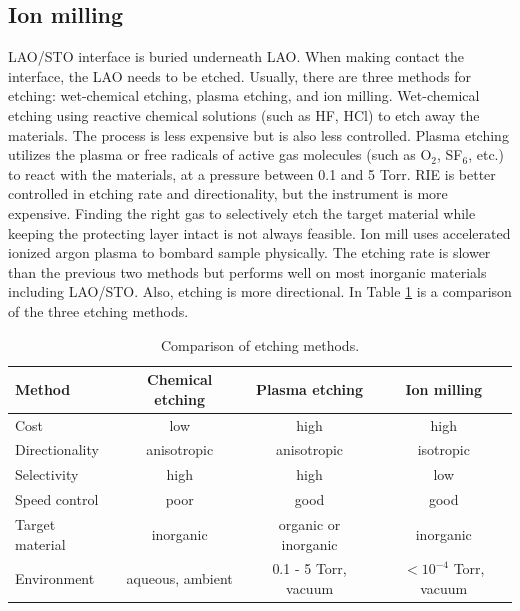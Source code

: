 \documentclass[pdflatex, sectionletters, 12pt]{pittetd}    %
\begin{document}
\subsection{Ion milling}
\label{SEC:IonMilling}
LAO/STO interface is buried underneath LAO. When making contact the interface, the LAO needs to be etched. Usually, there are three methods for etching: wet-chemical etching, plasma etching, and ion milling. Wet-chemical etching using reactive chemical solutions (such as HF, HCl) to etch away the materials. The process is less expensive but is also less controlled. Plasma etching utilizes the plasma or free radicals of active gas molecules (such as O$_2$, SF$_6$, etc.) to react with the materials, at a pressure between 0.1 and 5 Torr. RIE is better controlled in etching rate and directionality, but the instrument is more expensive. Finding the right gas to selectively etch the target material while keeping the protecting layer intact is not always feasible. Ion mill uses accelerated ionized argon plasma to bombard sample physically. The etching rate is slower than the previous two methods but performs well on most inorganic materials including LAO/STO. Also, etching is more directional. In Table \ref{TAB:etching} is a comparison of the three etching methods.

\begin{table}
	\centering
	\begin{tabular}{l|ccc}
		\hline
		Method    &    Chemical etching    &    Plasma etching    & Ion milling \\ \hline
		Cost    &    low    & high    & high \\ 
		Directionality    &    anisotropic    &    anisotropic    &    isotropic \\ 
		Selectivity    &    high    &    high    &    low \\
		Speed control    &    poor    &    good    &    good \\
		Target material    &    inorganic    &    organic or inorganic    &    inorganic \\
		Environment    &    aqueous, ambient    &    0.1 - 5 Torr, vacuum    &    $< 10^{-4}$ Torr, vacuum \\
		\hline  
		
	\end{tabular}
	\caption{Comparison of etching methods.}
	\label{TAB:etching}
	
\end{table}
\end{document}
